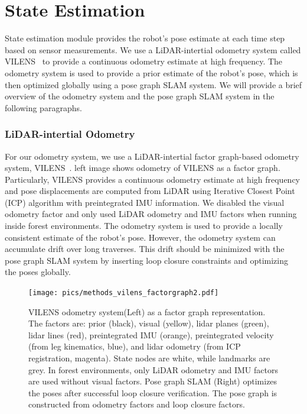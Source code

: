 \section{State Estimation}
State estimation module provides the robot's pose estimate at each time step based on sensor measurements. We use a LiDAR-intertial odometry system called VILENS~\cite{wisth2023tro} to provide a continuous odometry estimate at high frequency. The odometry system is used to provide a prior estimate of the robot's pose, which is then optimized globally using a pose graph SLAM system. We will provide a brief overview of the odometry system and the pose graph SLAM system in the following paragraphs. 

\subsubsection*{\textbf{LiDAR-intertial Odometry}} 
For our odometry system, we use a LiDAR-intertial factor graph-based odometry system, VILENS~\cite{wisth2023tro}.  left image shows odometry of VILENS as a factor graph. Particularly, VILENS provides a continuous odometry estimate at high frequency and pose displacements are computed from LiDAR using Iterative Closest Point (ICP) algorithm with preintegrated IMU information. We disabled the visual odometry factor and only used LiDAR odometry and IMU factors when running inside forest environments. 
The odometry system is used to provide a locally consistent estimate of the robot's pose. However, the odometry system can accumulate drift over long traverses. This drift should be minimized with the pose graph SLAM system by inserting loop closure constraints and optimizing the poses globally.  
\begin{figure}[t]
  \centering
  \texttt{[image: pics/methods\_vilens\_factorgraph2.pdf]}
  \caption{VILENS odometry system(Left) as a factor graph representation. The factors are: prior (black), visual
 (yellow), lidar planes (green), lidar lines (red), preintegrated IMU (orange), preintegrated velocity (from leg kinematics, blue), and lidar odometry (from ICP registration, magenta). State nodes are white, while landmarks are grey. In forest environments, only LiDAR odometry and IMU factors are used without visual factors. Pose graph SLAM (Right) optimizes the poses after successful loop closure verification. The pose graph is constructed from odometry factors and loop closure factors.}
  \label{fig:vilens_factorgraph}
\end{figure}

